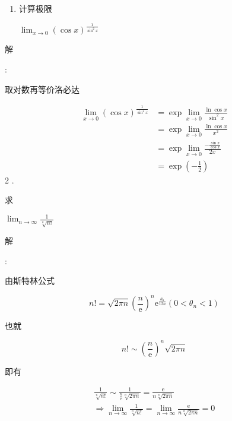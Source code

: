 \documentclass[10pt]{article}
\begin{document}
\begin{enumerate}
  \item \begin{CJK}{UTF8}{mj}计算极限\end{CJK} $\lim _{x \rightarrow 0}(\cos x)^{\frac{1}{\sin ^{2} x}}$
\end{enumerate}
\begin{CJK}{UTF8}{mj}解\end{CJK}: \begin{CJK}{UTF8}{mj}取对数再等价洛必达\end{CJK}
$$
\begin{aligned}
\lim _{x \rightarrow 0}(\cos x)^{\frac{1}{\sin ^{2} x}} &=\exp \lim _{x \rightarrow 0} \frac{\ln \cos x}{\sin ^{2} x} \\
&=\exp \lim _{x \rightarrow 0} \frac{\ln \cos x}{x^{2}} \\
&=\exp \lim _{x \rightarrow 0} \frac{-\frac{\sin x}{\cos x}}{2 x} \\
&=\exp \left(-\frac{1}{2}\right)
\end{aligned}
$$
2 . \begin{CJK}{UTF8}{mj}求\end{CJK} $\lim _{n \rightarrow \infty} \frac{1}{\sqrt[n]{n !}}$

\begin{CJK}{UTF8}{mj}解\end{CJK}: \begin{CJK}{UTF8}{mj}由斯特林公式\end{CJK}
$$
n !=\sqrt{2 \pi n}\left(\frac{n}{\mathrm{e}}\right)^{n} \mathrm{e}^{\frac{\theta_{\mathrm{n}}}{12 n}}\left(0<\theta_{n}<1\right)
$$
\begin{CJK}{UTF8}{mj}也就\end{CJK}
$$
n ! \sim\left(\frac{n}{\mathrm{e}}\right)^{n} \sqrt{2 \pi n}
$$
\begin{CJK}{UTF8}{mj}即有\end{CJK}
$$
\begin{gathered}
\frac{1}{\sqrt[n]{n !}} \sim \frac{1}{\frac{n}{\mathrm{e}} \sqrt[n]{2 \pi n}}=\frac{\mathrm{e}}{n \sqrt[n]{2 \pi n}} \\
\Rightarrow \lim _{n \rightarrow \infty} \frac{1}{\sqrt[n]{n !}}=\lim _{n \rightarrow \infty} \frac{\mathrm{e}}{n \sqrt[n]{2 \pi n}}=0
\end{gathered}
$$
\end{document}
